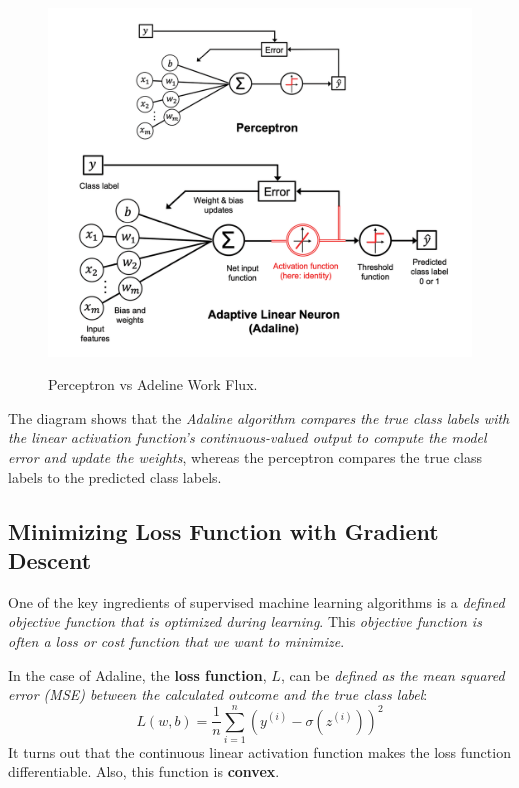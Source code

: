 \documentclass[../machine_learning_scikit.tex]{subfiles}
\begin{document}
    \begin{figure}[h]
        \begin{minipage}{\textwidth}
            \centering
            \includegraphics[scale=0.8]{images/perceptron_pipeline.png} \\
            \caption{Perceptron vs Adeline Work Flux.}
            \label{figure:perceptron_vs_adeline_work_flux}
        \end{minipage}
    \end{figure}

    \begin{obs}
        The diagram shows that the \textit{Adaline algorithm compares the true class labels with the linear activation function's continuous-valued output to compute the model error and update the weights}, whereas the perceptron compares the true class labels to the predicted class labels.
    \end{obs}

    \subsection{Minimizing Loss Function with Gradient Descent}

    One of the key ingredients of supervised machine learning algorithms is a \textit{defined objective function that is optimized during learning}. This \textit{objective function is often a loss or cost function that we want to minimize}.

    \begin{obs}
        In the case of Adaline, the \textbf{loss function}, $L$, can be \textit{defined as the mean squared error (MSE) between the calculated outcome and the true class label}:
        \begin{equation*}
            L(w,b)=\frac{1}{n}\sum_{ i=1}^n\left(y^{(i)}-\sigma\left(z^{(i)}\right)\right)^2
        \end{equation*}
        It turns out that the continuous linear activation function makes the loss function differentiable. Also, this function is \textbf{convex}.
    \end{obs}
\end{document}

